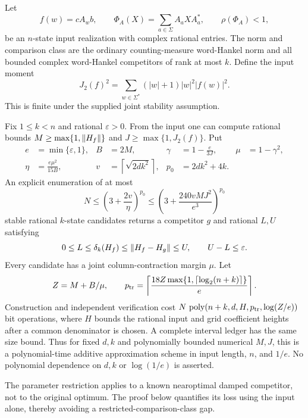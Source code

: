 Let
\[
 f(w)=cA_wb,\qquad \Phi_A(X)=\sum_{a\in\Sigma}A_aXA_a^*,
 \qquad \rho(\Phi_A)<1,
\]
be an $n$-state input realization with complex rational entries. The norm
and comparison class are the ordinary counting-measure word-Hankel norm
and all bounded complex word-Hankel competitors of rank at most $k$.
Define the input moment
\begin{equation}
 J_2(f)^2=\sum_{w\in\Sigma^*}(|w|+1)|w|^2|f(w)|^2.
 \label{I:F:eq:g1-input-moment}
\end{equation}
This is finite under the supplied joint stability assumption.

\begin{theorem}
\label{I:F:thm:g1-net}
Fix $1\le k<n$ and rational $\varepsilon>0$. From the input one can compute
rational bounds $M\ge\max\{1,\left\lVert H_f\right\rVert\}$ and
$J\ge\max\{1,J_2(f)\}$. Put
\begin{align}
 e&=\min\{\varepsilon,1\},& B&=2M,&
 \gamma&=1-\frac{e}{3J},& \mu&=1-\gamma^2,\nonumber\\
 \eta&=\frac{e\mu^2}{15B},&
 v&=\left\lceil\sqrt{2dk^2}\right\rceil,&
 p_0&=2dk^2+4k.
 \label{I:F:eq:g1-parameters}
\end{align}
An explicit enumeration of at most
\begin{equation}
 N\le\left(3+\frac{2v}{\eta}\right)^{p_0}
   \le\left(3+\frac{240vMJ^2}{e^3}\right)^{p_0}
 \label{I:F:eq:g1-net-size}
\end{equation}
stable rational $k$-state candidates returns a competitor $g$ and rational
$L,U$ satisfying
\begin{equation}
 0\le L\le\delta_k(H_f)\le\left\lVert H_f-H_g\right\rVert\le U,
 \qquad U-L\le\varepsilon.
 \label{I:F:eq:g1-global-gap}
\end{equation}
Every candidate has a joint column-contraction margin $\mu$. Let
\[
 Z=M+B/\mu,\qquad
 p_{\rm tr}=\left\lceil
 \frac{18Z\max\{1,\lceil\log_2(n+k)\rceil\}}e\right\rceil.
\]
Construction and independent verification cost
$N\,\operatorname{poly}(n+k,d,H,p_{\rm tr},\log(Z/e))$ bit operations,
where $H$ bounds the rational input and grid coefficient heights after a
common denominator is chosen. A complete interval ledger has the same
size bound. Thus for fixed $d,k$ and polynomially bounded numerical $M,J$,
this is a polynomial-time additive approximation scheme in input length,
$n$, and $1/e$. No polynomial dependence on $d,k$ or $\log(1/e)$ is asserted.
\end{theorem}

The parameter restriction applies to a known nearoptimal damped competitor,
not to the original optimum. The proof below quantifies its loss using the
input alone, thereby avoiding a restricted-comparison-class gap.

